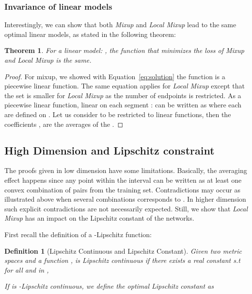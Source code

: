 \documentclass[twoside]{article}
\newtheorem{theorem}{Theorem}[section]
\numberwithin{intassumption}{assumption}
\newtheorem{definition}{Definition}[section]
\begin{document}
\subsubsection{Invariance of linear models}

Interestingly, we can show that both \emph{Mixup} and \emph{Local Mixup} lead to the same optimal linear models, as stated in the following theorem:

\begin{theorem}
    For a linear model: , the function  that minimizes the loss of \emph{Mixup} and \emph{Local Mixup} is the same. 
\end{theorem} 
\begin{proof}
    For mixup, we showed with Equation~\eqref{eq:solution} the function  is a piecewise linear function. The same equation applies for \emph{Local Mixup} except that the set  is smaller for \emph{Local Mixup} as the number of endpoints is restricted.
    As a piecewise linear function, linear on each segment :  can be written as  where each  are defined on .
    Let us consider  to be restricted to linear functions, then the coefficients ,  are the averages of the .
\end{proof}

\subsection{High Dimension and Lipschitz constraint}\label{Lipschistsection}
The proofs given in low dimension have some limitations. Basically, the averaging effect happens since any point  within the interval  can be written as at least one convex combination of pairs from the training set. Contradictions may occur as illustrated above when several combinations corresponds to . In higher dimension such explicit contradictions are not necessarily expected. Still, we show that \emph{Local Mixup} has an impact on the Lipschitz constant of the networks.

First recall the definition of a -Lipschitz function: 

\begin{definition}[Lipschitz Continuous and Lipschitz Constant]
    Given two metric spaces  and a function ,  is Lipschitz continuous if there exists a real constant  s.t for all  and  in , 
    
     If  is -Lipschitz continuous, we define the optimal Lipschitz constant  as
     
\end{definition}
 
\end{document}
